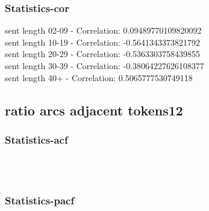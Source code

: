 \documentclass{article}%
\begin{document}
%
\newpage%
\subsubsection{Statistics{-}cor}%
\label{ssubsec:Statistics{-}cor}%
\noindent%
sent length 02-09 - Correlation: 0.09489770109820092\\%
sent length 10-19 - Correlation: -0.5641343373821792\\%
sent length 20-29 - Correlation: -0.5363303758439855\\%
sent length 30-39 - Correlation: -0.38064227626108377\\%
sent length 40+ - Correlation: 0.5065777530749118\\

%
\newpage

%
\subsection{ratio arcs adjacent tokens12}%
\label{subsec:ratioarcsadjacenttokens12}%
\subsubsection{Statistics{-}acf}%
\label{ssubsec:Statistics{-}acf}%


\begin{figure}[ht]%
\centering%
\setlength{\abovecaptionskip}{-35pt}%
%
%
\\%
%
%
\\%
%
\end{figure}

%
\newpage%
\subsubsection{Statistics{-}pacf}%
\label{ssubsec:Statistics{-}pacf}%
\end{document}
